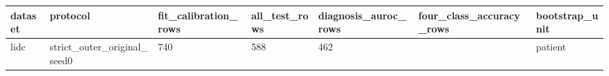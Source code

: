 \begin{tabular}{lllllll}
\hline
dataset & protocol & fit\_calibration\_rows & all\_test\_rows & diagnosis\_auroc\_rows & four\_class\_accuracy\_rows & bootstrap\_unit \\
\hline
lidc & strict\_outer\_original\_seed0 & 740 & 588 & 462 &  & patient \\
\hline
\end{tabular}
